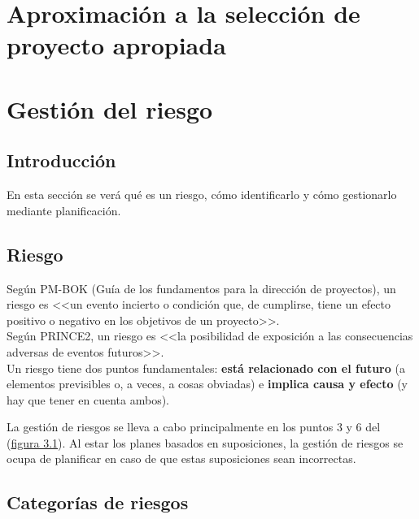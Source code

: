 \documentclass[12pt]{article}
\begin{document}
\newpage
\section[Aproximación a la selección de proyecto apropiada]{Aproximación a la selección de\\proyecto apropiada}
\label{6.0.0}


\newpage
\section{Gestión del riesgo}
\label{7.0.0}

\subsection{Introducción}
\label{7.1.0}

{En esta sección se verá qué es un riesgo, cómo identificarlo y cómo gestionarlo mediante planificación.}

\subsection{Riesgo}
\label{7.2.0}

{Según PM-BOK (Guía de los fundamentos para la dirección de proyectos), un riesgo es <<un evento incierto o condición que, de cumplirse, tiene un efecto positivo o negativo en los objetivos de un proyecto>>.} \\

{Según PRINCE2, un riesgo es <<la posibilidad de exposición a las consecuencias adversas de eventos futuros>>.} \\

{Un riesgo tiene dos puntos fundamentales: \textbf{está relacionado con el futuro} (a elementos previsibles o, a veces, a cosas obviadas) e \textbf{implica causa y efecto} (y hay que tener en cuenta ambos).}

{La gestión de riesgos se lleva a cabo principalmente en los puntos 3 y 6 del  (\hyperref[fig:3.1]{figura 3.1}). Al estar los planes basados en suposiciones, la gestión de riesgos se ocupa de planificar en caso de que estas suposiciones sean incorrectas.}

\subsection{Categorías de riesgos}
\label{7.3.0}
\end{document}
